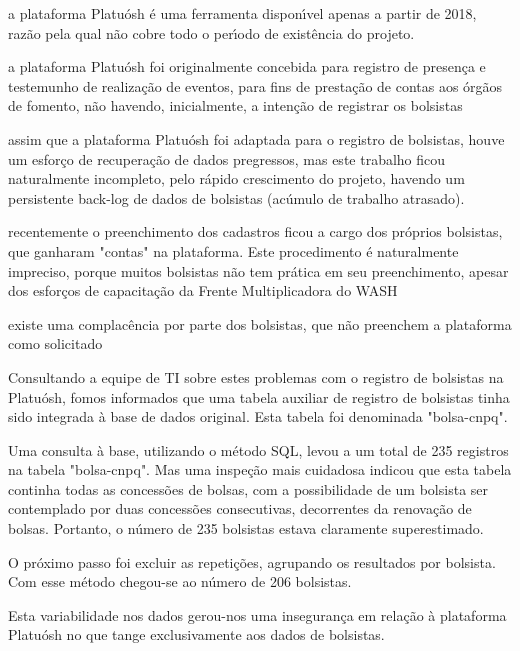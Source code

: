 \documentclass[
12pt,		%
openright,	%
twoside,  %
a4paper,			%
chapter=TITLE,		%
english,			%
french,				%
spanish,			%
brazil				%
]{USPSC-classe/USPSC}
\begin{document}
\begin{alineas}
\item a plataforma Platu\'osh \'e uma ferramenta dispon\'{\i}vel apenas a partir de 2018, raz\~ao pela qual n\~ao cobre todo o per\'{\i}odo de exist\^encia do projeto.
\item a plataforma Platu\'osh foi originalmente concebida para registro de presen\c{c}a e testemunho de realiza\c{c}\~ao de eventos, para fins de presta\c{c}\~ao de contas aos \'org\~aos de fomento, n\~ao havendo, inicialmente, a inten\c{c}\~ao de registrar os bolsistas
\item assim que a plataforma Platu\'osh foi adaptada para o registro de bolsistas, houve um esfor\c{c}o de recupera\c{c}\~ao de dados pregressos, mas este trabalho ficou naturalmente incompleto, pelo r\'apido crescimento do projeto, havendo um persistente back-log de dados de bolsistas (ac\'umulo de trabalho atrasado).
\item recentemente o preenchimento dos cadastros ficou a cargo dos pr\'oprios bolsistas, que ganharam "contas" na plataforma. Este procedimento \'e naturalmente impreciso, porque muitos bolsistas n\~ao tem pr\'atica em seu preenchimento, apesar dos esfor\c{c}os de capacita\c{c}\~ao da Frente Multiplicadora do WASH
\item existe uma complac\^encia por parte dos bolsistas, que n\~ao preenchem a plataforma como solicitado
\end{alineas}

Consultando a equipe de TI sobre estes problemas com o registro de bolsistas na Platu\'osh, fomos informados que uma tabela auxiliar de registro de bolsistas tinha sido integrada \`a base de dados original. Esta tabela foi denominada "bolsa-cnpq".


Uma consulta \`a base, utilizando o m\'etodo SQL, levou a um total de 235 registros na tabela "bolsa-cnpq". Mas uma inspe\c{c}\~ao mais cuidadosa indicou que esta tabela continha todas as concess\~oes de bolsas, com a possibilidade de um bolsista ser contemplado por duas concess\~oes consecutivas, decorrentes da renova\c{c}\~ao de bolsas. Portanto, o n\'umero de 235 bolsistas estava claramente superestimado.


O pr\'oximo passo foi excluir as repeti\c{c}\~oes, agrupando os resultados por bolsista. Com esse m\'etodo chegou-se ao n\'umero de 206 bolsistas.


Esta variabilidade nos dados gerou-nos uma inseguran\c{c}a em rela\c{c}\~ao \`a plataforma Platu\'osh no que tange exclusivamente aos dados de bolsistas.
\end{document}

